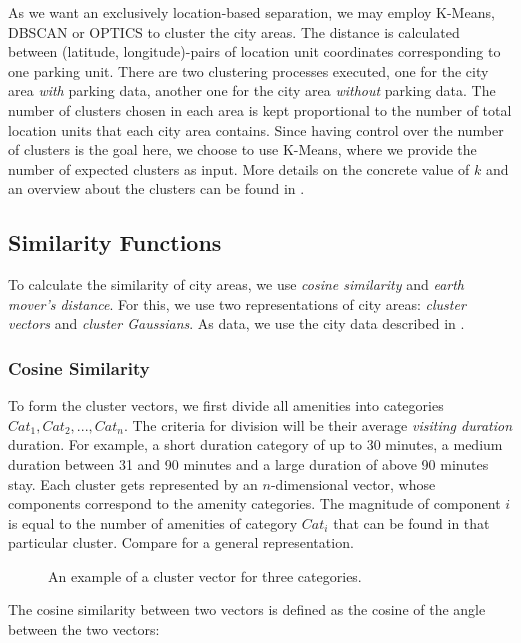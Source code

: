 As we want an exclusively location-based separation, we may employ K-Means, DBSCAN or OPTICS to cluster the city areas. The distance is calculated between (latitude, longitude)-pairs of location unit coordinates corresponding to one parking unit. There are two clustering processes executed, one for the city area \textit{with} parking data, another one for the city area \textit{without} parking data. The number of clusters chosen in each area is kept proportional to the number of total location units that each city area contains. Since having control over the number of clusters is the goal here, we choose to use K-Means, where we provide the number of expected clusters as input. More details on the concrete value of $k$ and an overview about the clusters can be found in .

\subsection{Similarity Functions}
\label{realization:similarity_functions}
To calculate the similarity of city areas, we use \textit{cosine similarity} and \textit{earth mover's distance}. For this, we use two representations of city areas: \textit{cluster vectors} and \textit{cluster Gaussians}. As data, we use the city data described in .

\subsubsection{Cosine Similarity}
\label{realization:vectors}
To form the cluster vectors, we first divide all amenities into categories $Cat_1, Cat_2, ..., Cat_n$.
The criteria for division will be their average \textit{visiting duration} duration.
For example, a short duration category of up to 30 minutes, a medium duration between 31 and 90 minutes and a large duration of above 90 minutes stay.
Each cluster gets represented by an $n$-dimensional vector, whose components correspond to the amenity categories.
The magnitude of component $i$ is equal to the number of amenities of category $Cat_i$ that can be found in that particular cluster.
Compare  for a general representation.

\begin{figure}[!ht]
	\centering
	
	\caption{An example of a cluster vector for three categories.}
	\label{fig:cluster_vector}
\end{figure}
The cosine similarity between two vectors is defined as the cosine of the angle between the two vectors:

